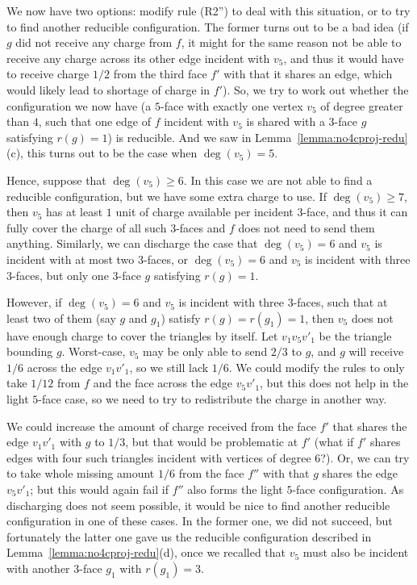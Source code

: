 \documentclass[12pt,twoside,openright,a4paper]{book}
\begin{document}
We now have two options: modify rule (R2'') to deal with this situation, or to try to find another reducible configuration.
The former turns out to be a bad idea (if $g$ did not receive any charge from $f$, it might for the same reason
not be able to receive any charge across its other edge incident with $v_5$, and thus it would have to receive charge
$1/2$ from the third face $f'$ with that it shares an edge, which would likely lead to shortage of charge in $f'$).
So, we try to work out whether the configuration we now have (a $5$-face with exactly one vertex $v_5$ of degree greater than $4$,
such that one edge of $f$ incident with $v_5$ is shared with a $3$-face $g$ satisfying $r(g)=1$) is reducible.
And we saw in Lemma~\ref{lemma:no4cproj-redu}(c), this turns out to be the case when $\deg(v_5)=5$.

Hence, suppose that $\deg(v_5)\ge 6$.  In this case we are not able to find a reducible configuration, but we have some
extra charge to use.  If $\deg(v_5)\ge 7$, then $v_5$ has at least $1$ unit of charge available
per incident $3$-face, and thus it can fully cover the charge of all such $3$-faces and $f$ does not need to send them anything.
Similarly, we can discharge the case that $\deg(v_5)=6$ and $v_5$ is incident with at most two $3$-faces,
or $\deg(v_5)=6$ and $v_5$ is incident with three $3$-faces, but only one $3$-face $g$ satisfying $r(g)=1$.

However, if $\deg(v_5)=6$ and $v_5$ is incident with three $3$-faces, such that at least two of them (say $g$ and $g_1$)
satisfy $r(g)=r(g_1)=1$, then $v_5$ does not have enough charge to cover the triangles by itself.
Let $v_1v_5v'_1$ be the triangle bounding $g$.  Worst-case, $v_5$ may be only able to send $2/3$ to $g$, and
$g$ will receive $1/6$ across the edge $v_1v'_1$, so we still lack $1/6$.  We could modify the rules to only take $1/12$
from $f$ and the face across the edge $v_5v'_1$, but this does not help in the light $5$-face case, so we need to
try to redistribute the charge in another way.

We could increase the amount of charge received from the face $f'$ that shares the edge $v_1v'_1$ with $g$ to $1/3$, but that would
be problematic at $f'$ (what if $f'$ shares edges with four such triangles incident with vertices of degree $6$?).
Or, we can try to take whole missing amount $1/6$ from the face $f''$ with that $g$ shares the edge $v_5v'_1$;
but this would again fail if $f''$ also forms the light $5$-face configuration.  As discharging does not seem possible,
it would be nice to find another reducible configuration in one of these cases.  In the former one, we did not succeed,
but fortunately the latter one gave us the reducible configuration described in Lemma~\ref{lemma:no4cproj-redu}(d), once
we recalled that $v_5$ must also be incident with another $3$-face $g_1$ with $r(g_1)=3$.
\end{document}

